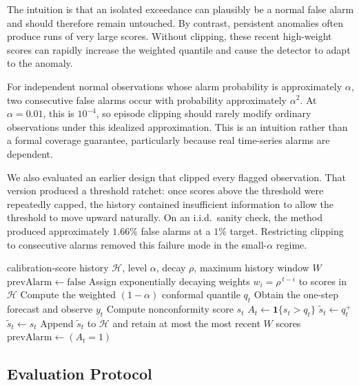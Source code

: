 \documentclass[11pt]{article}
\theoremstyle{definition}
\theoremstyle{remark}
\newcommand{\ind}[1]{\mathbf{1}\{#1\}}
\begin{document}
The intuition is that an isolated exceedance can plausibly be a normal false alarm and should therefore remain untouched. By contrast, persistent anomalies often produce runs of very large scores. Without clipping, these recent high-weight scores can rapidly increase the weighted quantile and cause the detector to adapt to the anomaly.

For independent normal observations whose alarm probability is approximately $\alpha$, two consecutive false alarms occur with probability approximately $\alpha^2$. At $\alpha = 0.01$, this is $10^{-4}$, so episode clipping should rarely modify ordinary observations under this idealized approximation. This is an intuition rather than a formal coverage guarantee, particularly because real time-series alarms are dependent.

We also evaluated an earlier design that clipped every flagged observation. That version produced a threshold ratchet: once scores above the threshold were repeatedly capped, the history contained insufficient information to allow the threshold to move upward naturally. On an i.i.d.\ sanity check, the method produced approximately $1.66\%$ false alarms at a $1\%$ target. Restricting clipping to consecutive alarms removed this failure mode in the small-$\alpha$ regime.

\begin{algorithm}[t]
\caption{Online weighted conformal thresholding with episode clipping (ours)}
\label{alg:clip}
\begin{algorithmic}[1]
\Require calibration-score history $\mathcal{H}$, level $\alpha$, decay $\rho$, maximum history window $W$
\State $\mathrm{prevAlarm} \gets \mathrm{false}$
  \State Assign exponentially decaying weights $w_i = \rho^{\,t-i}$ to scores in $\mathcal{H}$
  \State Compute the weighted $(1-\alpha)$ conformal quantile $q_t$
  \State Obtain the one-step forecast and observe $y_t$
  \State Compute nonconformity score $s_t$
  \State $A_t \gets \ind{s_t > q_t}$
    \State $\widetilde{s}_t \gets q_t^{+}$ 
  \Else
    \State $\widetilde{s}_t \gets s_t$
  \EndIf
  \State Append $\widetilde{s}_t$ to $\mathcal{H}$ and retain at most the most recent $W$ scores
  \State $\mathrm{prevAlarm} \gets (A_t = 1)$
\EndFor
\end{algorithmic}
\end{algorithm}

\subsection{Evaluation Protocol}
\end{document}
